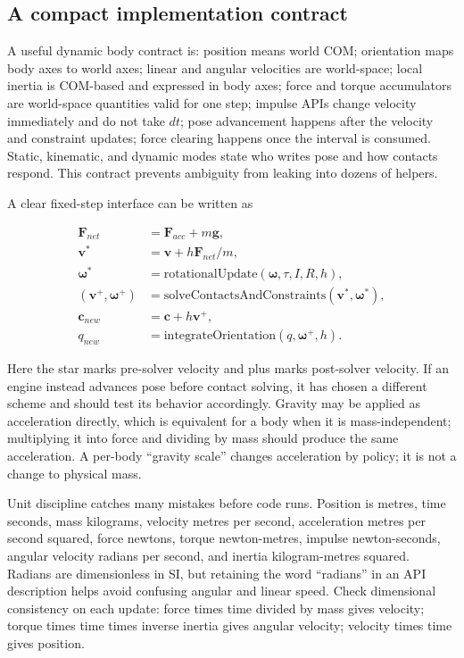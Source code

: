 \subsection{A compact implementation contract}\label{06-engine-ii-ch034-a-compact-implementation-contract}

A useful dynamic body contract is: position means world COM; orientation maps body axes to world axes; linear and angular velocities are world-space; local inertia is COM-based and expressed in body axes; force and torque accumulators are world-space quantities valid for one step; impulse APIs change velocity immediately and do not take \(dt\); pose advancement happens after the velocity and constraint updates; force clearing happens once the interval is consumed. Static, kinematic, and dynamic modes state who writes pose and how contacts respond. This contract prevents ambiguity from leaking into dozens of helpers.

A clear fixed-step interface can be written as

\[
\begin{aligned}
\mathbf F_{net}&=\mathbf F_{acc}+m\mathbf g,\\
\mathbf v^*&=\mathbf v+h\mathbf F_{net}/m,\\
\boldsymbol\omega^*&=\text{rotationalUpdate}(\boldsymbol\omega,\tau,I,R,h),\\
(\mathbf v^+,\boldsymbol\omega^+)&=\text{solveContactsAndConstraints}(\mathbf v^*,\boldsymbol\omega^*),\\
\mathbf c_{new}&=\mathbf c+h\mathbf v^+,\\
q_{new}&=\text{integrateOrientation}(q,\boldsymbol\omega^+,h).
\end{aligned}
\]

Here the star marks pre-solver velocity and plus marks post-solver velocity. If an engine instead advances pose before contact solving, it has chosen a different scheme and should test its behavior accordingly. Gravity may be applied as acceleration directly, which is equivalent for a body when it is mass-independent; multiplying it into force and dividing by mass should produce the same acceleration. A per-body ``gravity scale'' changes acceleration by policy; it is not a change to physical mass.

Unit discipline catches many mistakes before code runs. Position is metres, time seconds, mass kilograms, velocity metres per second, acceleration metres per second squared, force newtons, torque newton-metres, impulse newton-seconds, angular velocity radians per second, and inertia kilogram-metres squared. Radians are dimensionless in SI, but retaining the word ``radians'' in an API description helps avoid confusing angular and linear speed. Check dimensional consistency on each update: force times time divided by mass gives velocity; torque times time times inverse inertia gives angular velocity; velocity times time gives position.

